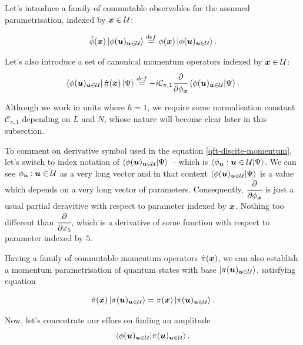 \documentclass[main.tex]{subfiles}
\begin{document}
Let's introduce a family of commutable observables for the assumed parametrisation, indexed by $\boldsymbol{x}\in \mathcal{U}$:

\begin{equation}
\hat{\phi}(\boldsymbol{x}) \ket{\phi(\boldsymbol{u})_{\boldsymbol{u}\in \mathcal{U}}} \stackrel{def}{=} \phi(\boldsymbol{x}) \ket{\phi(\boldsymbol{u})_{\boldsymbol{u}\in \mathcal{U}}}.
\end{equation}

Let's also introduce a set of canonical momentum operators indexed by $\boldsymbol{x} \in \mathcal{U}$:
\begin{equation}
\label{qft-discite-momentum}
\bra{\phi(\boldsymbol{u})_{\boldsymbol{u}\in \mathcal{U}}} \hat{\pi}(\boldsymbol{x}) \ket{\Psi}  \stackrel{def}{=} -i\mathcal{C}_{\pi,1}\cfrac{\partial}{\partial \phi_{\boldsymbol{x}}} \bra{\phi(\boldsymbol{u})_{\boldsymbol{u}\in \mathcal{U}}}  \ket{\Psi}. 
\end{equation}

Although we work in units where $\hbar = 1$, we require some normalisation constant $\mathcal{C}_{\pi,1}$ depending on $L$ and $N$, whose nature will become clear later in this subsection.

To comment on derivative symbol used in the equation \ref{qft-discite-momentum}, let's switch to index notation of $\bra{\phi(\boldsymbol{u})_{\boldsymbol{u}\in \mathcal{U}}}  \ket{\Psi}$ -- which is $\bra{\phi_{\boldsymbol{u}}: \boldsymbol{u}\in \mathcal{U}}  \ket{\Psi}$. We can see $\phi_{\boldsymbol{u}}: \boldsymbol{u}\in \mathcal{U}$ as a very long vector and in that context $\bra{\phi(\boldsymbol{u})_{\boldsymbol{u}\in \mathcal{U}}}  \ket{\Psi}$ is a value which depends on a very long vector of parameters. Consequently, $\cfrac{\partial}{\partial \phi_{\boldsymbol{x}}}$ is just a usual partial deravitive with respect to parameter indexed by $\boldsymbol{x}$. Nothing too different than $\cfrac{\partial}{\partial x_5}$, which is a derivative of some function with respect to parameter indexed by $5$.

Having a family of commutable momentum operators $\hat{\pi}(\boldsymbol{x})$, we can also establish a momentum parametrisation of quantum states with base $\ket{\pi(\boldsymbol{u})_{\boldsymbol{u}\in \mathcal{U}}}$, satisfying equation

\begin{equation}
\hat{\pi}(\boldsymbol{x}) \ket{\pi(\boldsymbol{u})_{\boldsymbol{u}\in \mathcal{U}}} = \pi(\boldsymbol{x}) \ket{\pi(\boldsymbol{u})_{\boldsymbol{u}\in \mathcal{U}}}.
\end{equation}

Now, let's concentrate our effors on finding an amplitude
\begin{equation}
\bra{\phi(\boldsymbol{u})_{\boldsymbol{u}\in \mathcal{U}}} \ket{\pi(\boldsymbol{u})_{\boldsymbol{u}\in \mathcal{U}}}.
\end{equation}
\end{document}
